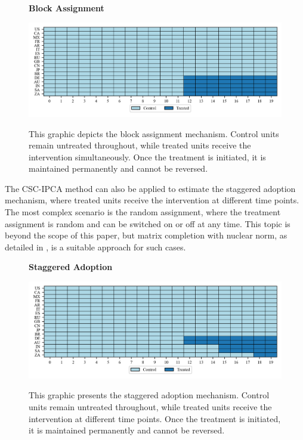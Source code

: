 \documentclass[12pt]{article}
\begin{document}
\begin{figure}[!ht]
\centering
\caption{\textbf{Block Assignment}}
\includegraphics{figs/block_assignment.png}
\label{app: block assignment}
\caption*{\footnotesize{This graphic depicts the block assignment mechanism. Control units remain untreated throughout, while treated units receive the intervention simultaneously. Once the treatment is initiated, it is maintained permanently and cannot be reversed.}}
\end{figure}

The CSC-IPCA method can also be applied to estimate the staggered adoption mechanism, where treated units receive the intervention at different time points. The most complex scenario is the random assignment, where the treatment assignment is random and can be switched on or off at any time. This topic is beyond the scope of this paper, but matrix completion with nuclear norm, as detailed in \cite{athey2021matrix}, is a suitable approach for such cases.

\begin{figure}[!ht]
\centering
\caption{\textbf{Staggered Adoption}}
\includegraphics{figs/staggered_adoption.png}
\label{app: staggered adoption}
\caption*{\footnotesize{This graphic presents the staggered adoption mechanism. Control units remain untreated throughout, while treated units receive the intervention at different time points. Once the treatment is initiated, it is maintained permanently and cannot be reversed.}}
\end{figure}
\end{document}
